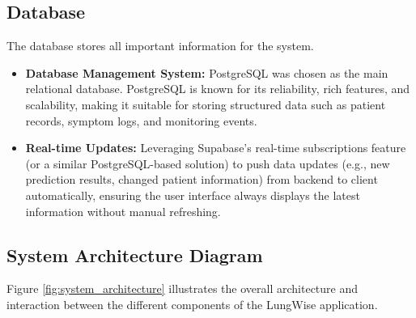 \subsection{Database}

The database stores all important information for the system.
\begin{itemize}
    \item \textbf{Database Management System:} PostgreSQL \cite{postgresql} was chosen as the main relational database. PostgreSQL is known for its reliability, rich features, and scalability, making it suitable for storing structured data such as patient records, symptom logs, and monitoring events.
    \item \textbf{Real-time Updates:} Leveraging Supabase's \cite{supabase} real-time subscriptions feature (or a similar PostgreSQL-based solution) to push data updates (e.g., new prediction results, changed patient information) from backend to client automatically, ensuring the user interface always displays the latest information without manual refreshing.
\end{itemize}

\subsection{System Architecture Diagram}

Figure \ref{fig:system_architecture} illustrates the overall architecture and interaction between the different components of the LungWise application.

